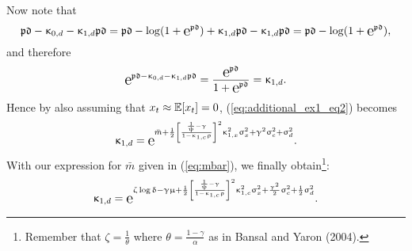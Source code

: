 Now note that
\begin{equation}
	\pdbar - \kappa_{0,d} - \kappa_{1,d} \pdbar = \pdbar - \log(1+\e{\pdbar}) + \kappa_{1,d}\pdbar - \kappa_{1,d}\pdbar = \pdbar  - \log(1+\e{\pdbar}),
\end{equation}
and therefore
$$
	\e{\pdbar -\kappa_{0,d} - \kappa_{1,d} \pdbar} = \frac{\e{\pdbar}}{1+\e{\pdbar}} = \kappa_{1,d}.
$$
Hence by also assuming that $x_t \approx \mathbb{E}[x_t] = 0$, (\ref{eq:additional_ex1_eq2}) becomes
$$
	\kappa_{1,d} = \e{\bar{m} + \frac{1}{2}\left[\frac{\ies-\gamma}{1-\kappa_{1,c}\rho}\right]^2\kappa_{1,x}^2\sigma_x^2 +\gamma^2\sigma_c^2 + \sigma_d^2}  .
$$
With our expression for $\bar{m}$ given in (\ref{eq:mbar}), we finally obtain\footnote{Remember that $\zeta= \frac{1}{\theta}$ where $\theta = \frac{1-\gamma}{\alpha}$ as in Bansal and Yaron (2004).}:
\begin{equation}
		\kappa_{1,d} = \e{\zeta\log\delta -\gamma\mu + \half\left[\frac{\ies-\gamma}{1-\kappa_{1,c}\rho}\right]^2\kappa_{1,c}^2\sigma_x^2 +\frac{\gamma^2}{2}\sigma_c^2 + \half\sigma_d^2} .
\end{equation}

